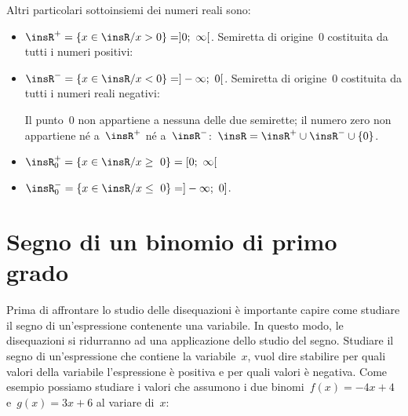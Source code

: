 \begin{esempio}
Altri particolari sottoinsiemi dei numeri reali sono:

\begin{itemize} [noitemsep]
\item $\insR^{+}=\{x\in \insR/x>0\} = ]0;~\infty[$.
Semiretta di origine~0 costituita da tutti i numeri positivi:
\begin{center}
 
\end{center}
\item $\insR^{-}=\{x\in \insR/x<0\} = ]- \infty;~0[$.
Semiretta di origine~0 costituita da tutti i numeri reali negativi:
\begin{center}
 
\end{center}
\subitem Il punto~0 non appartiene a nessuna delle due semirette; il numero
 zero non appartiene né
 a~$\insR^{+}$ né a~$\insR^{-}$:~$\insR=\insR^{+}\cup\insR^{-}\cup\{0\}$.
\item $\insR_{0}^{+}=\{x\in \insR/x\ge~0\} = [0;~\infty[$
\item $\insR_{0}^{-}=\{x\in \insR/x\le~0\} = ]- \infty;~0]$.
\end{itemize}
\end{esempio}


\section{Segno di un binomio di primo grado}
\label{sec:dis_binomio}

Prima di affrontare lo studio delle disequazioni è importante capire come
studiare il segno di un'espressione contenente una variabile.
In questo modo, le disequazioni si ridurranno ad una applicazione dello
studio del segno.
Studiare il segno di un'espressione che contiene la variabile~$x$, vuol dire
stabilire per quali valori della variabile l'espressione è positiva e per
quali valori è negativa.
Come esempio possiamo studiare i valori che assumono i due
binomi~$f(x) = -4 x +4$ e~$g(x) = 3 x +6$ al variare di~$x$:

